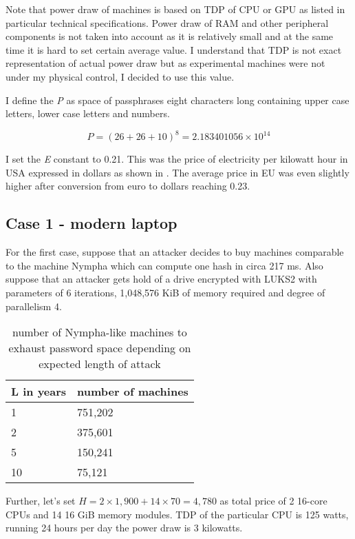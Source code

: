 \documentclass[nolof,digital]{fithesis3}
\begin{document}
Note that power draw of machines is based on TDP of CPU or GPU as listed in particular technical specifications. Power draw of RAM and other peripheral components is not taken into account as it is relatively small and at the same time it is hard to set certain average value. I understand that TDP is not exact representation of actual power draw but as experimental machines were not under my physical control, I decided to use this value.

I define the \emph{P} as space of passphrases eight characters long containing upper case letters, lower case letters and numbers.

$$P = (26 + 26 + 10)^8 = 2.183401056 \times 10^{14}$$

I set the \emph{E} constant to 0.21. This was the price of electricity per kilowatt hour in USA expressed in dollars as shown in \parencite{electricity}. The average price in EU was even slightly higher after conversion from euro to dollars reaching 0.23.

\subsection{Case 1 - modern laptop}
\FloatBarrier
For the first case, suppose that an attacker decides to buy machines comparable to the machine Nympha which can compute one hash in circa 217 ms. Also suppose that an attacker gets hold of a drive encrypted with LUKS2 with parameters of 6 iterations, 1,048,576 KiB of memory required and degree of parallelism 4.

\noindent
\begin{table}
\caption{number of Nympha-like machines to exhaust password space depending on expected length of attack}
\label{tab:at1}
\begin{tabularx}{\textwidth}{| X | X |}
\hline
L in years & number of machines\\
\hline
1 & 751,202\\
\hline
2 & 375,601\\
\hline
5 & 150,241\\
\hline
10 & 75,121\\
\hline
\end{tabularx}
\end{table}

Further, let's set $H = 2 \times 1,900 + 14 \times 70 = 4,780$ as total price of 2 16-core CPUs and 14 16 GiB memory modules. TDP of the particular CPU is 125 watts, running 24 hours per day the power draw is 3 kilowatts.
\end{document}
